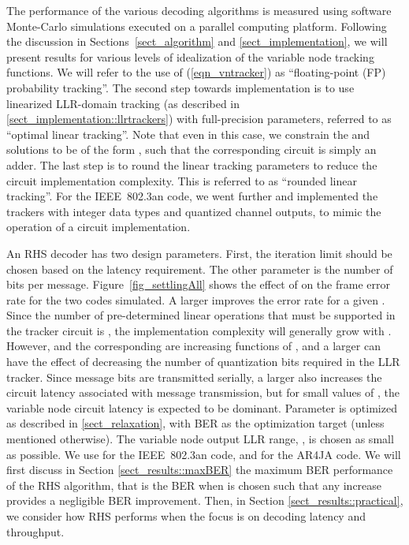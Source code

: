 \documentclass[12pt,journal,twoside,draftcls,onecolumn]{IEEEtran}
\begin{document}
The performance of the various decoding algorithms is measured using software Monte-Carlo simulations executed on a parallel computing platform.
Following the discussion in Sections~\ref{sect_algorithm} and \ref{sect_implementation}, we will present results for various levels of idealization of the variable node tracking functions. We will refer to the use of (\ref{eqn_vntracker}) as ``floating-point (FP) probability tracking''. The second step towards implementation is to use linearized LLR-domain tracking (as described in \ref{sect_implementation::llrtrackers}) with full-precision parameters, referred to as ``optimal linear tracking''. Note that even in this case, we constrain the  and  solutions to be of the form , such that the corresponding circuit is simply an adder. The last step is to round the linear tracking parameters to reduce the circuit implementation complexity. This is referred to as ``rounded linear tracking''. For the IEEE~802.3an code, we went further and implemented the trackers with integer data types and quantized channel outputs, to mimic the operation of a circuit implementation.

An RHS decoder has two design parameters. First, the iteration limit  should be chosen based on the latency requirement. The other parameter is the number  of bits per message. Figure~\ref{fig_settlingAll} shows the effect of  on the frame error rate for the two codes simulated. A larger  improves the error rate for a given . Since the number of pre-determined linear operations that must be supported in the tracker circuit is , the implementation complexity will generally grow with . 
However,  and the corresponding  are increasing functions of , and a larger  can have the effect of decreasing the number of quantization bits required in the LLR tracker.
Since message bits are transmitted serially, a larger  also increases the circuit latency associated with message transmission, but for small values of , the variable node circuit latency is expected to be dominant.
Parameter  is optimized as described in \ref{sect_relaxation}, with BER as the optimization target (unless mentioned otherwise). The variable node output LLR range, , is chosen as small as possible. We use  for the IEEE~802.3an code, and  for the AR4JA code. 
We will first discuss in Section \ref{sect_results::maxBER} the maximum BER performance of the RHS algorithm, that is the BER when  is chosen such that any increase provides a negligible BER improvement. Then, in Section \ref{sect_results::practical}, we consider how RHS performs when the focus is on decoding latency and throughput.
\end{document}

